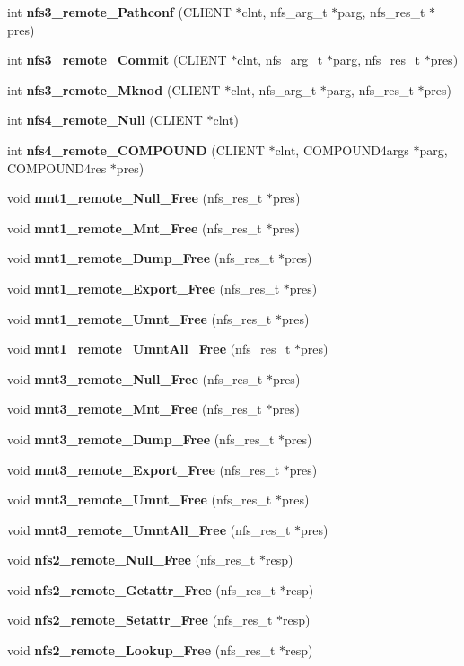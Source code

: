 \begin{CompactItemize}
\item 
int {\bf nfs3\_\-remote\_\-Pathconf} (CLIENT $\ast$clnt, nfs\_\-arg\_\-t $\ast$parg, nfs\_\-res\_\-t $\ast$pres)
\item 
int {\bf nfs3\_\-remote\_\-Commit} (CLIENT $\ast$clnt, nfs\_\-arg\_\-t $\ast$parg, nfs\_\-res\_\-t $\ast$pres)
\item 
int {\bf nfs3\_\-remote\_\-Mknod} (CLIENT $\ast$clnt, nfs\_\-arg\_\-t $\ast$parg, nfs\_\-res\_\-t $\ast$pres)
\item 
int {\bf nfs4\_\-remote\_\-Null} (CLIENT $\ast$clnt)
\item 
int {\bf nfs4\_\-remote\_\-COMPOUND} (CLIENT $\ast$clnt, COMPOUND4args $\ast$parg, COMPOUND4res $\ast$pres)
\item 
void {\bf mnt1\_\-remote\_\-Null\_\-Free} (nfs\_\-res\_\-t $\ast$pres)
\item 
void {\bf mnt1\_\-remote\_\-Mnt\_\-Free} (nfs\_\-res\_\-t $\ast$pres)
\item 
void {\bf mnt1\_\-remote\_\-Dump\_\-Free} (nfs\_\-res\_\-t $\ast$pres)
\item 
void {\bf mnt1\_\-remote\_\-Export\_\-Free} (nfs\_\-res\_\-t $\ast$pres)
\item 
void {\bf mnt1\_\-remote\_\-Umnt\_\-Free} (nfs\_\-res\_\-t $\ast$pres)
\item 
void {\bf mnt1\_\-remote\_\-UmntAll\_\-Free} (nfs\_\-res\_\-t $\ast$pres)
\item 
void {\bf mnt3\_\-remote\_\-Null\_\-Free} (nfs\_\-res\_\-t $\ast$pres)
\item 
void {\bf mnt3\_\-remote\_\-Mnt\_\-Free} (nfs\_\-res\_\-t $\ast$pres)
\item 
void {\bf mnt3\_\-remote\_\-Dump\_\-Free} (nfs\_\-res\_\-t $\ast$pres)
\item 
void {\bf mnt3\_\-remote\_\-Export\_\-Free} (nfs\_\-res\_\-t $\ast$pres)
\item 
void {\bf mnt3\_\-remote\_\-Umnt\_\-Free} (nfs\_\-res\_\-t $\ast$pres)
\item 
void {\bf mnt3\_\-remote\_\-UmntAll\_\-Free} (nfs\_\-res\_\-t $\ast$pres)
\item 
void {\bf nfs2\_\-remote\_\-Null\_\-Free} (nfs\_\-res\_\-t $\ast$resp)
\item 
void {\bf nfs2\_\-remote\_\-Getattr\_\-Free} (nfs\_\-res\_\-t $\ast$resp)
\item 
void {\bf nfs2\_\-remote\_\-Setattr\_\-Free} (nfs\_\-res\_\-t $\ast$resp)
\item 
void {\bf nfs2\_\-remote\_\-Lookup\_\-Free} (nfs\_\-res\_\-t $\ast$resp)

\end{CompactItemize}
